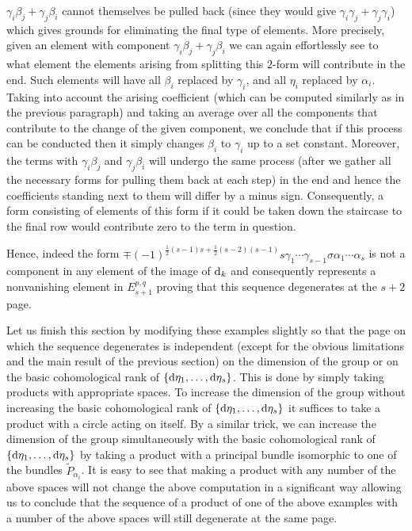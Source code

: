 \documentclass[10pt,a4paper]{amsart}
\numberwithin{equation}{section}
\theoremstyle{definition}
\begin{document}
$\gamma_i\beta_j+\gamma_j\beta_i$ cannot themselves be pulled back (since they would give $\gamma_i\gamma_j+\gamma_j\gamma_i$) which gives grounds for eliminating the final type of elements. More precisely, given an element with component $\gamma_i\beta_j+\gamma_j\beta_i$ we can again effortlessly see to what element the elements arising from splitting this $2$-form will contribute in the end. Such elements will have all $\beta_i$ replaced by $\gamma_i$, and all $\eta_i$ replaced by $\alpha_i$. Taking into account the arising coefficient (which can be computed similarly as in the previous paragraph) and taking an average over all the components that contribute to the change of the given component, we conclude that if this process can be conducted then it simply changes $\beta_i$ to $\gamma_i$ up to a set constant. Moreover, the terms with $\gamma_i\beta_j$ and $\gamma_j\beta_i$ will undergo the same process (after we gather all the necessary forms for pulling them back at each step) in the end and hence the coefficients standing next to them will differ by a minus sign. Consequently, a form consisting of elements of this form if it could be taken down the staircase to the final row would contribute zero to the term in question.

Hence, indeed the form
$\mp (-1)^{\frac{1}{2}(s-1)s+\frac{1}{2}(s-2)(s-1)}s\gamma_1\cdots \gamma_{s-1}\sigma\alpha_1\cdots \alpha_s$
is not a component in any element of the image of ${\rm d}_k$ and consequently represents a nonvanishing element in $E_{s+1}^{p,q}$ proving that this sequence degenerates at the $s+2$ page.

Let us finish this section by modifying these examples slightly so that the page on which the sequence degenerates is independent (except for the obvious limitations and the main result of the previous section) on the dimension of the group or on the basic cohomological rank of $\{{\rm d}\eta_1,\dots,{\rm d}\eta_s\}$. This is done by simply taking products with appropriate spaces. To increase the dimension of the group without increasing the basic cohomological rank of $\{{\rm d}\eta_1,\dots,{\rm d}\eta_s\}$ it suffices to take a product with a circle acting on itself. By a similar trick, we can increase the dimension of the group simultaneously with the basic cohomological rank of $\{{\rm d}\eta_1,\dots,{\rm d}\eta_s\}$ by taking a product with a principal bundle isomorphic to one of the bundles $\tilde{P}_{\alpha_i}$. It is easy to see that making a product with any number of the above spaces will not change the above computation in a significant way allowing us to conclude that the sequence of a product of one of the above examples with a number of the above spaces will still degenerate at the same page.
\end{document}
